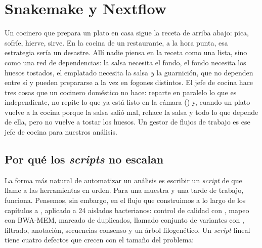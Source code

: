 \section{Snakemake y Nextflow}\label{sec:18-flujos}

\begin{intuicion}
Un cocinero que prepara un plato en casa sigue la receta de arriba abajo: pica, sofríe, hierve, sirve. En la cocina de un restaurante, a la hora punta, esa estrategia sería un desastre. Allí nadie piensa en la receta como una lista, sino como una red de dependencias: la salsa necesita el fondo, el fondo necesita los huesos tostados, el emplatado necesita la salsa \emph{y} la guarnición, que no dependen entre sí y pueden prepararse a la vez en fogones distintos. El jefe de cocina hace tres cosas que un cocinero doméstico no hace: reparte en paralelo lo que es independiente, no repite lo que ya está listo en la cámara () y, cuando un plato vuelve a la cocina porque la salsa salió mal, rehace la salsa y todo lo que depende de ella, pero no vuelve a tostar los huesos. Un gestor de flujos de trabajo es ese jefe de cocina para nuestros análisis.
\end{intuicion}

\subsection{Por qué los \emph{scripts} no escalan}

La forma más natural de automatizar un análisis es escribir un \emph{script} de  que llame a las herramientas en orden. Para una muestra y una tarde de trabajo, funciona. Pensemos, sin embargo, en el flujo que construimos a lo largo de los capítulos  a , aplicado a 24 aislados bacterianos: control de calidad con , mapeo con BWA-MEM, marcado de duplicados, llamado conjunto de variantes con , filtrado, anotación, secuencias consenso y un árbol filogenético. Un \emph{script} lineal tiene cuatro defectos que crecen con el tamaño del problema:

